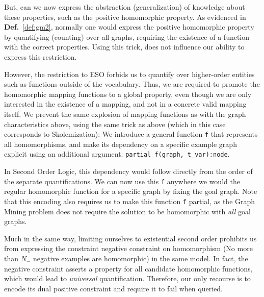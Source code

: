 \documentclass{article}
\theoremstyle{definition}
\begin{document}
But, can we now express the abstraction (generalization) of knowledge about these properties, such as the positive homomorphic property.
As evidenced in \textbf{Def.}~\ref{def:gm2}, normally one would express the positive homomorphic property by quantifying (counting) over all graphs, requiring the existence of a function with the correct properties.
Using this trick, does not influence our ability to express this restriction.

However, the restriction to ESO forbids us to quantify over higher-order entities such as functions outside of the vocabulary.
Thus, we are required to promote the homomorphic mapping functions to a global property, even though we are only interested in the existence of a mapping, and not in a concrete valid mapping itself.
We prevent the same explosion of mapping functions as with the graph characteristics above, using the same trick as above (which in this case corresponds to Skolemization):
We introduce a general function \verb|f| that represents all homomorphisms, and make its dependency on a specific example graph explicit using an additional argument:
\verb|partial f(graph, t_var):node|.

In Second Order Logic, this dependency would follow directly from the order of the separate quantifications.
We can now use this \verb|f| anywhere we would the regular homomorphic function for a specific graph by fixing the goal graph.
Note that this encoding also requires us to make this function \verb|f| partial, as the Graph Mining problem does not require the solution to be homomorphic with \emph{all} goal graphs.

Much in the same way, limiting ourselves to existential second order prohibits us from expressing the constraint negative constraint on homomorphism (No more than $N_{-}$ negative examples are homomorphic) in the same model.
In fact, the negative constraint asserts a property for all candidate homomorphic functions, which would lead to \emph{universal} quantification.
Therefore, our only recourse is to encode its dual positive constraint and require it to fail when queried.
\end{document}
